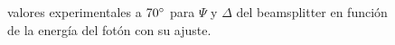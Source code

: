 \begin{figure}[!hbt]
	\centering
\caption[Gr\'aficas de $\Psi$ y $\Delta$ del beamspliter a $70 \degree$.]{valores experimentales a $70\degree$  para $\Psi$ y $\Delta$ del beamsplitter en funci\'on de la energ\'ia del fot\'on con su ajuste.} 
\label{Met:fig:ElipBS}
\end{figure}
